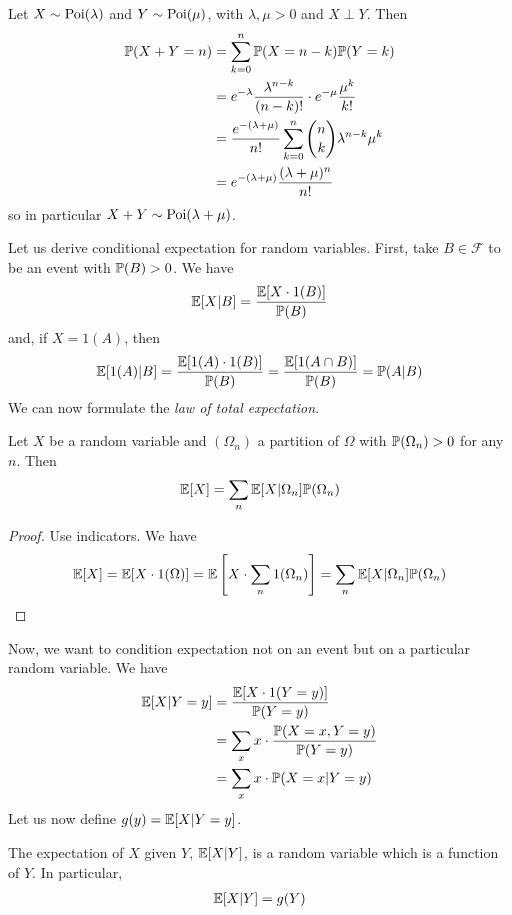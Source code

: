\documentclass{../../template/note}
\begin{document}
    \begin{example*}
        Let \(X \sim \operatorname{Poi}(\lambda)\) and \(Y \sim \operatorname{Poi}(\mu)\), with \(\lambda, \mu > 0\) and \(X \perp Y\). Then
        \begin{align*}
            \mathbb P(X + Y = n) &= \sum_{k=0}^n \mathbb P(X = n-k)\mathbb P(Y = k) \\
            &= e^{-\lambda}\frac{\lambda^{n-k}}{(n-k)!} \cdot e^{-\mu}\frac{\mu^k}{k!} \\
            &= \frac{e^{-(\lambda+\mu)}}{n!} \sum_{k=0}^n \binom n k \lambda^{n-k} \mu^k \\
            &= e^{-(\lambda+\mu)}\frac{(\lambda+\mu)^n}{n!}
        \end{align*}
        so in particular \(X + Y \sim \operatorname{Poi}(\lambda + \mu)\).        
    \end{example*}
    Let us derive conditional expectation for random variables. First, take \(B \in \mathcal F\) to be an event with \(\mathbb P(B) > 0\). We have
    \begin{align*}
        \mathbb E[X | B] = \frac{\mathbb E[X \cdot 1(B)]}{\mathbb P(B)}
    \end{align*}
    and, if \(X = 1(A)\), then
    \begin{align*}
        \mathbb E[1(A) | B] = \frac{\mathbb E[1(A) \cdot 1(B)]}{\mathbb P(B)} = \frac{\mathbb E[1(A \cap B)]}{\mathbb P(B)} = \mathbb P(A | B)
    \end{align*}
    We can now formulate the \emph{law of total expectation}.
    \begin{proposition}
        Let \(X\) be a random variable and \((\Omega_n)\) a partition of \(\Omega\) with \(\mathbb P(\Omega_n) > 0\) for any \(n\). Then
        \begin{align*}
            \mathbb E[X] = \sum_n \mathbb E[X | \Omega_n] \mathbb P(\Omega_n)
        \end{align*}
    \end{proposition}
    \begin{proof}
        Use indicators. We have
        \begin{align*}
            \mathbb E[X] = \mathbb E[X \cdot 1(\Omega)] = \mathbb E\left[X \cdot \sum_n 1(\Omega_n)\right] = \sum_n \mathbb E[X | \Omega_n]\mathbb P(\Omega_n)
        \end{align*}
    \end{proof}
    Now, we want to condition expectation not on an event but on a particular random variable. We have
    \begin{align*}
        \mathbb E[X | Y = y] &= \frac{\mathbb E[X \cdot 1(Y=y)]}{\mathbb P(Y=y)} \\
        &= \sum_x x \cdot \frac{\mathbb P(X = x, Y = y)}{\mathbb P(Y = y)} \\
        &= \sum_x x \cdot \mathbb P(X = x | Y = y)
    \end{align*}
    Let us now define \(g(y) = \mathbb E[X | Y = y]\).
    \begin{definition}
        The expectation of \(X\) given \(Y\), \(\mathbb E[X | Y]\), is a random variable which is a function of \(Y\). In particular,
        \begin{align*}
            \mathbb E[X | Y] = g(Y)
        \end{align*}
    \end{definition}
    
\end{document}
